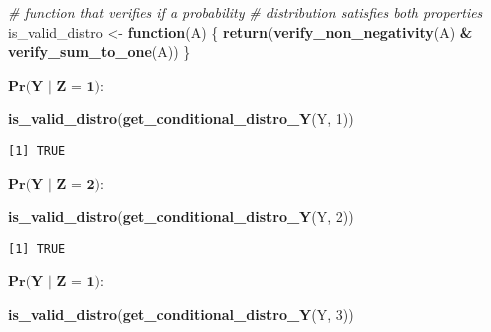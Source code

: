 \documentclass[
]{article}
\newenvironment{Shaded}{\begin{snugshade}}{\end{snugshade}}
\newcommand{\CommentTok}[1]{\textcolor[rgb]{0.56,0.35,0.01}{\textit{#1}}}
\newcommand{\ControlFlowTok}[1]{\textcolor[rgb]{0.13,0.29,0.53}{\textbf{#1}}}
\newcommand{\DecValTok}[1]{\textcolor[rgb]{0.00,0.00,0.81}{#1}}
\newcommand{\FunctionTok}[1]{\textcolor[rgb]{0.13,0.29,0.53}{\textbf{#1}}}
\newcommand{\NormalTok}[1]{#1}
\newcommand{\OtherTok}[1]{\textcolor[rgb]{0.56,0.35,0.01}{#1}}
\newcommand{\SpecialCharTok}[1]{\textcolor[rgb]{0.81,0.36,0.00}{\textbf{#1}}}
\begin{document}
\begin{Shaded}
\begin{Highlighting}[]
\CommentTok{\# function that verifies if a probability}
\CommentTok{\# distribution satisfies both properties}
\NormalTok{is\_valid\_distro }\OtherTok{\textless{}{-}} \ControlFlowTok{function}\NormalTok{(A) \{}
    \FunctionTok{return}\NormalTok{(}\FunctionTok{verify\_non\_negativity}\NormalTok{(A) }\SpecialCharTok{\&} \FunctionTok{verify\_sum\_to\_one}\NormalTok{(A))}
\NormalTok{\}}
\end{Highlighting}
\end{Shaded}

\vspace{0.5cm}

\(\textbf{Pr(Y | Z = 1)}\):

\begin{Shaded}
\begin{Highlighting}[]
\FunctionTok{is\_valid\_distro}\NormalTok{(}\FunctionTok{get\_conditional\_distro\_Y}\NormalTok{(Y, }\DecValTok{1}\NormalTok{))}
\end{Highlighting}
\end{Shaded}

\begin{verbatim}
[1] TRUE
\end{verbatim}

\vspace{0.5cm}

\(\textbf{Pr(Y | Z = 2)}\):

\begin{Shaded}
\begin{Highlighting}[]
\FunctionTok{is\_valid\_distro}\NormalTok{(}\FunctionTok{get\_conditional\_distro\_Y}\NormalTok{(Y, }\DecValTok{2}\NormalTok{))}
\end{Highlighting}
\end{Shaded}

\begin{verbatim}
[1] TRUE
\end{verbatim}

\vspace{0.5cm}

\(\textbf{Pr(Y | Z = 1)}\):

\begin{Shaded}
\begin{Highlighting}[]
\FunctionTok{is\_valid\_distro}\NormalTok{(}\FunctionTok{get\_conditional\_distro\_Y}\NormalTok{(Y, }\DecValTok{3}\NormalTok{))}
\end{Highlighting}
\end{Shaded}
\end{document}

